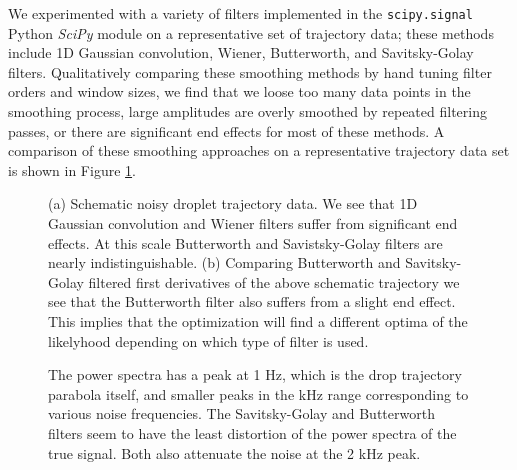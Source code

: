 \documentclass[12pt,a4paper,oneside]{book}
\begin{document}
We experimented with a variety of filters implemented in the \verb|scipy.signal| Python \emph{SciPy}\cite{oliphant_python_2007} module on a representative set of trajectory data; these methods include 1D Gaussian convolution, Wiener, Butterworth, and Savitsky-Golay filters. Qualitatively comparing these smoothing methods by hand tuning filter orders and window sizes, we find that we loose too many data points in the smoothing process, large amplitudes are overly smoothed by repeated filtering passes, or there are significant end effects for most of these methods. A comparison of these smoothing approaches on a representative trajectory data set is shown in Figure \ref{fig:y_filtered}.
\begin{figure}[htp]
    \centering
    \subfloat[]{%
}


     \subfloat[]{%
}
       \caption{(a) Schematic noisy droplet trajectory data. We see that 1D Gaussian convolution and Wiener filters suffer from significant end effects. At this scale Butterworth and Savistsky-Golay filters are nearly indistinguishable. (b) Comparing Butterworth and Savitsky-Golay filtered	 first derivatives of the above schematic trajectory we see that the Butterworth filter also suffers from a slight end effect. This implies that the optimization will find a different optima of the likelyhood depending on which type of filter is used.}
      \label{fig:y_filtered}
\end{figure}
%    
\begin{figure}
    \centering
    
    \caption{The power spectra has a peak at 1 Hz, which is the drop trajectory parabola itself, and smaller peaks in the kHz range corresponding to various noise frequencies. The Savitsky-Golay and Butterworth filters seem to have the least distortion of the power spectra of the true signal. Both also attenuate the noise at the 2 kHz peak. \label{fig:power}}
\end{figure}
\end{document}

